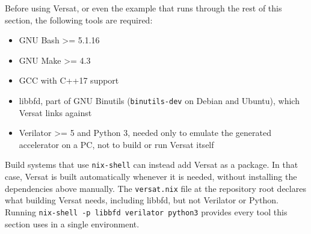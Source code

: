 %

Before using Versat, or even the example that runs through the rest of this section, the following tools are required:

\begin{itemize}
  \itemsep-0.5em
  \item GNU Bash >= 5.1.16
  \item GNU Make >= 4.3
  \item GCC with C++17 support
  \item libbfd, part of GNU Binutils (\texttt{binutils-dev} on Debian and Ubuntu), which Versat links against
  \item Verilator >= 5 and Python 3, needed only to emulate the generated accelerator on a PC, not to build or run Versat itself
\end{itemize}

Build systems that use \texttt{nix-shell} can instead add Versat as a package. In that case, Versat is built automatically whenever it is needed, without installing the dependencies above manually. The \texttt{versat.nix} file at the repository root declares what building Versat needs, including libbfd, but not Verilator or Python. Running \texttt{nix-shell -p libbfd verilator python3} provides every tool this section uses in a single environment.
